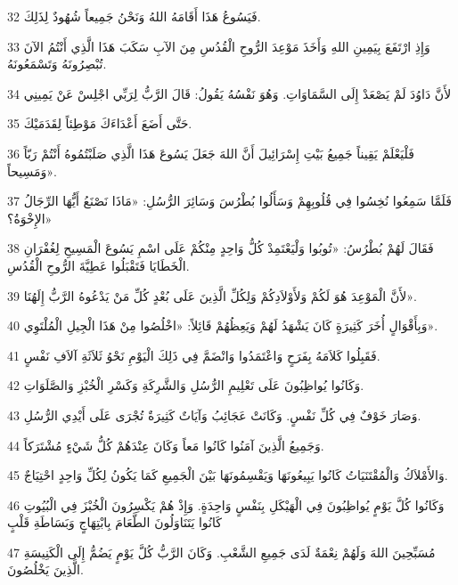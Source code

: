 \par 32 فَيَسُوعُ هَذَا أَقَامَهُ اللهُ وَنَحْنُ جَمِيعاً شُهُودٌ لِذَلِكَ.
\par 33 وَإِذِ ارْتَفَعَ بِيَمِينِ اللهِ وَأَخَذَ مَوْعِدَ الرُّوحِ الْقُدُسِ مِنَ الآبِ سَكَبَ هَذَا الَّذِي أَنْتُمُ الآنَ تُبْصِرُونَهُ وَتَسْمَعُونَهُ.
\par 34 لأَنَّ دَاوُدَ لَمْ يَصْعَدْ إِلَى السَّمَاوَاتِ. وَهُوَ نَفْسُهُ يَقُولُ: قَالَ الرَّبُّ لِرَبِّي اجْلِسْ عَنْ يَمِينِي
\par 35 حَتَّى أَضَعَ أَعْدَاءَكَ مَوْطِئاً لِقَدَمَيْكَ.
\par 36 فَلْيَعْلَمْ يَقِيناً جَمِيعُ بَيْتِ إِسْرَائِيلَ أَنَّ اللهَ جَعَلَ يَسُوعَ هَذَا الَّذِي صَلَبْتُمُوهُ أَنْتُمْ رَبّاً وَمَسِيحاً».
\par 37 فَلَمَّا سَمِعُوا نُخِسُوا فِي قُلُوبِهِمْ وَسَأَلُوا بُطْرُسَ وَسَائِرَ الرُّسُلِ: «مَاذَا نَصْنَعُ أَيُّهَا الرِّجَالُ الإِخْوَةُ؟»
\par 38 فَقَالَ لَهُمْ بُطْرُسُ: «تُوبُوا وَلْيَعْتَمِدْ كُلُّ وَاحِدٍ مِنْكُمْ عَلَى اسْمِ يَسُوعَ الْمَسِيحِ لِغُفْرَانِ الْخَطَايَا فَتَقْبَلُوا عَطِيَّةَ الرُّوحِ الْقُدُسِ.
\par 39 لأَنَّ الْمَوْعِدَ هُوَ لَكُمْ وَلأَوْلاَدِكُمْ وَلِكُلِّ الَّذِينَ عَلَى بُعْدٍ كُلِّ مَنْ يَدْعُوهُ الرَّبُّ إِلَهُنَا».
\par 40 وَبِأَقْوَالٍ أُخَرَ كَثِيرَةٍ كَانَ يَشْهَدُ لَهُمْ وَيَعِظُهُمْ قَائِلاً: «اخْلُصُوا مِنْ هَذَا الْجِيلِ الْمُلْتَوِي».
\par 41 فَقَبِلُوا كَلاَمَهُ بِفَرَحٍ وَاعْتَمَدُوا وَانْضَمَّ فِي ذَلِكَ الْيَوْمِ نَحْوُ ثَلاَثَةِ آلاَفِ نَفْسٍ.
\par 42 وَكَانُوا يُواظِبُونَ عَلَى تَعْلِيمِ الرُّسُلِ وَالشَّرِكَةِ وَكَسْرِ الْخُبْزِ وَالصَّلَوَاتِ.
\par 43 وَصَارَ خَوْفٌ فِي كُلِّ نَفْسٍ. وَكَانَتْ عَجَائِبُ وَآيَاتٌ كَثِيرَةٌ تُجْرَى عَلَى أَيْدِي الرُّسُلِ.
\par 44 وَجَمِيعُ الَّذِينَ آمَنُوا كَانُوا مَعاً وَكَانَ عِنْدَهُمْ كُلُّ شَيْءٍ مُشْتَرَكاً.
\par 45 وَالأَمْلاَكُ وَالْمُقْتَنَيَاتُ كَانُوا يَبِيعُونَهَا وَيَقْسِمُونَهَا بَيْنَ الْجَمِيعِ كَمَا يَكُونُ لِكُلِّ وَاحِدٍ احْتِيَاجٌ.
\par 46 وَكَانُوا كُلَّ يَوْمٍ يُواظِبُونَ فِي الْهَيْكَلِ بِنَفْسٍ وَاحِدَةٍ. وَإِذْ هُمْ يَكْسِرُونَ الْخُبْزَ فِي الْبُيُوتِ كَانُوا يَتَنَاوَلُونَ الطَّعَامَ بِابْتِهَاجٍ وَبَسَاطَةِ قَلْبٍ
\par 47 مُسَبِّحِينَ اللهَ وَلَهُمْ نِعْمَةٌ لَدَى جَمِيعِ الشَّعْبِ. وَكَانَ الرَّبُّ كُلَّ يَوْمٍ يَضُمُّ إِلَى الْكَنِيسَةِ الَّذِينَ يَخْلُصُونَ.

